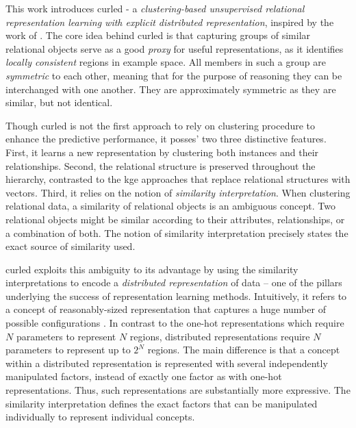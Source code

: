 This work introduces \gls{curled} - a \textit{clustering-based unsupervised relational representation learning with explicit distributed representation}, inspired by the work of \cite{coates2011analysis}.
The core idea behind \gls{curled} is that capturing groups of similar relational objects serve as a good \textit{proxy} for useful representations, as it identifies \textit{locally consistent} regions in example space.
All members in such a group are \textit{symmetric} to each other, meaning that for the purpose of reasoning they can be interchanged with one another.
They are approximately symmetric as they are similar, but not identical.



Though \gls{curled} is not the first approach to rely on clustering procedure to enhance the predictive performance, it posses' two three distinctive features.
First, it learns a new representation by clustering both instances and their relationships.
Second, the relational structure is  preserved throughout the hierarchy, contrasted to the \gls{kge} approaches that replace relational structures with vectors.
Third, it relies on the notion of \textit{similarity interpretation}.
When clustering relational data, a similarity of relational objects is an ambiguous concept.
Two relational objects might be similar according to their attributes, relationships, or a combination of both.
The notion of similarity interpretation precisely states the exact source of similarity used.



\gls{curled} exploits this ambiguity to its advantage by using the similarity interpretations to encode a \textit{distributed representation} of data -- one of the pillars underlying the success of representation learning methods.
Intuitively, it refers to a concept of  reasonably-sized representation that captures a huge number of possible configurations \cite{Bengio2013RLR}.
In contrast to the one-hot representations which require $N$ parameters to represent $N$ regions,  distributed representations require $N$ parameters to represent up to $2^N$ regions.
The main difference is that a concept within a distributed representation is represented with several independently manipulated factors, instead of exactly one factor as with one-hot representations.
Thus, such representations are substantially more expressive. 
The similarity interpretation defines the exact factors that can be manipulated individually to represent individual concepts.



